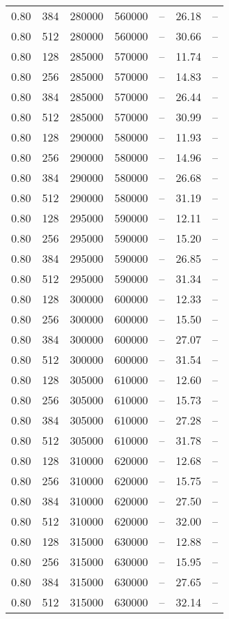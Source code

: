 \begin{tabular}{l|l|l|l|l|l|l}
0.80 & 384 & 280000 & 560000 & -- & 26.18 & --\\
0.80 & 512 & 280000 & 560000 & -- & 30.66 & --\\
0.80 & 128 & 285000 & 570000 & -- & 11.74 & --\\
0.80 & 256 & 285000 & 570000 & -- & 14.83 & --\\
0.80 & 384 & 285000 & 570000 & -- & 26.44 & --\\
0.80 & 512 & 285000 & 570000 & -- & 30.99 & --\\
0.80 & 128 & 290000 & 580000 & -- & 11.93 & --\\
0.80 & 256 & 290000 & 580000 & -- & 14.96 & --\\
0.80 & 384 & 290000 & 580000 & -- & 26.68 & --\\
0.80 & 512 & 290000 & 580000 & -- & 31.19 & --\\
0.80 & 128 & 295000 & 590000 & -- & 12.11 & --\\
0.80 & 256 & 295000 & 590000 & -- & 15.20 & --\\
0.80 & 384 & 295000 & 590000 & -- & 26.85 & --\\
0.80 & 512 & 295000 & 590000 & -- & 31.34 & --\\
0.80 & 128 & 300000 & 600000 & -- & 12.33 & --\\
0.80 & 256 & 300000 & 600000 & -- & 15.50 & --\\
0.80 & 384 & 300000 & 600000 & -- & 27.07 & --\\
0.80 & 512 & 300000 & 600000 & -- & 31.54 & --\\
0.80 & 128 & 305000 & 610000 & -- & 12.60 & --\\
0.80 & 256 & 305000 & 610000 & -- & 15.73 & --\\
0.80 & 384 & 305000 & 610000 & -- & 27.28 & --\\
0.80 & 512 & 305000 & 610000 & -- & 31.78 & --\\
0.80 & 128 & 310000 & 620000 & -- & 12.68 & --\\
0.80 & 256 & 310000 & 620000 & -- & 15.75 & --\\
0.80 & 384 & 310000 & 620000 & -- & 27.50 & --\\
0.80 & 512 & 310000 & 620000 & -- & 32.00 & --\\
0.80 & 128 & 315000 & 630000 & -- & 12.88 & --\\
0.80 & 256 & 315000 & 630000 & -- & 15.95 & --\\
0.80 & 384 & 315000 & 630000 & -- & 27.65 & --\\
0.80 & 512 & 315000 & 630000 & -- & 32.14 & --\\

\end{tabular}
